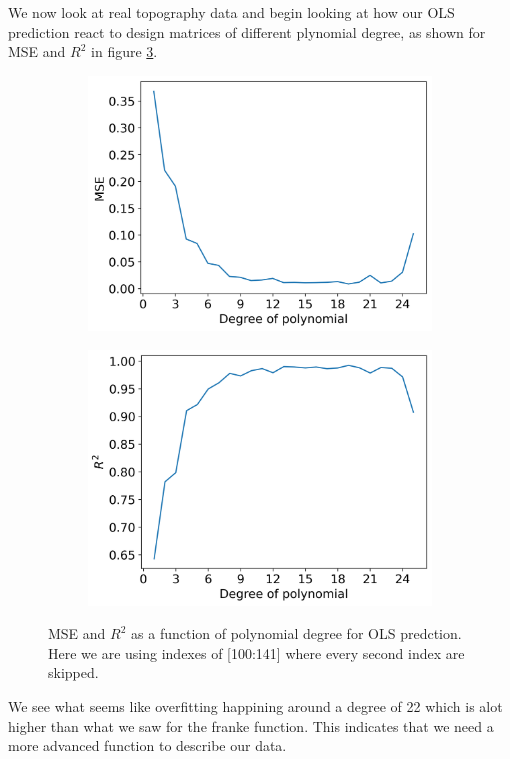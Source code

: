 \documentclass[12pt]{article}
\begin{document}
We now look at real topography data and begin looking at how our OLS prediction react to design matrices of different plynomial degree, as shown for MSE and $R^2$ in figure \ref{fig:mse_r2_real}.
\begin{figure}[H]
  \begin{subfigure}{.5\textwidth}
    \centering
    \includegraphics[width=\textwidth]{../figures/mse_deg_real.png}
    \caption{}
    \label{fig:}
  \end{subfigure}
  \begin{subfigure}{.5\textwidth}
    \centering
    \includegraphics[width=\textwidth]{../figures/r2_deg_real.png}
    \caption{}
    \label{fig:}
  \end{subfigure}
  \caption{MSE and $R^2$ as a function of polynomial degree for OLS predction. Here we are using indexes of [100:141] where every second index are skipped.}
  \label{fig:mse_r2_real}
\end{figure}
We see what seems like overfitting happining around a degree of 22 which is alot higher than what we saw for the franke function. This indicates that we need a more advanced function to describe our data.
\end{document}
